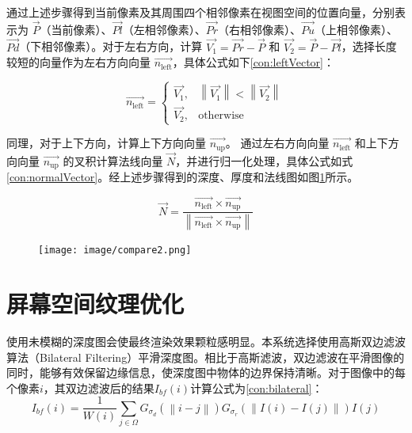 通过上述步骤得到当前像素及其周围四个相邻像素在视图空间的位置向量，分别表示为 $\vec{P}$（当前像素）、$\vec{Pl}$（左相邻像素）、$\vec{Pr}$（右相邻像素）、$\vec{Pu}$（上相邻像素）、$\vec{Pd}$（下相邻像素）。对于左右方向，计算 $\vec{V_1}=\vec{Pr}-\vec{P}$ 和 $\vec{V_2}=\vec{P}-\vec{Pl}$，选择长度较短的向量作为左右方向向量 $\vec{n_{\text{left}}}$，具体公式如下\ref{con:leftVector}：

\begin{equation}
    \vec{n_{\text{left}}}=\begin{cases}
        \vec{V_1}, & \left\|\vec{V_1}\right\|<\left\|\vec{V_2}\right\| \\
        \vec{V_2}, & \text{otherwise}
        \end{cases}
    \label{con:leftVector}
\end{equation}

同理，对于上下方向，计算上下方向向量 $\vec{n_{\text{up}}}$。
通过左右方向向量 $\vec{n_{\text{left}}}$ 和上下方向向量 $\vec{n_{\text{up}}}$ 的叉积计算法线向量 $\vec{N}$，并进行归一化处理，具体公式如式\ref{con:normalVector}。经上述步骤得到的深度、厚度和法线图如图\ref{fig:compare2}所示。

\begin{equation}
    \vec{N}=\frac{\vec{n_{\text{left}}} \times \vec{n_{\text{up}}}}{\left\|\vec{n_{\text{left}}} \times \vec{n_{\text{up}}}\right\|}
    \label{con:normalVector}
\end{equation}

\begin{figure}[ht]
    \centering
    \texttt{[image: image/compare2.png]}
    \label{fig:compare2}
\end{figure}


\section{屏幕空间纹理优化}
使用未模糊的深度图会使最终渲染效果颗粒感明显。本系统选择使用高斯双边滤波算法（Bilateral Filtering）平滑深度图。相比于高斯滤波，双边滤波在平滑图像的同时，能够有效保留边缘信息，使深度图中物体的边界保持清晰。对于图像中的每个像素$i$，其双边滤波后的结果$I_{bf}(i)$计算公式为\ref{con:bilateral}：
\begin{equation}
    I_{bf}(i)=\frac{1}{W(i)}\sum_{j\in\Omega}G_{\sigma_d}(\left \| i - j \right \|)G_{\sigma_r}(\left \| I(i)-I(j) \right \|)I(j)
    \label{con:bilateral}
\end{equation}

